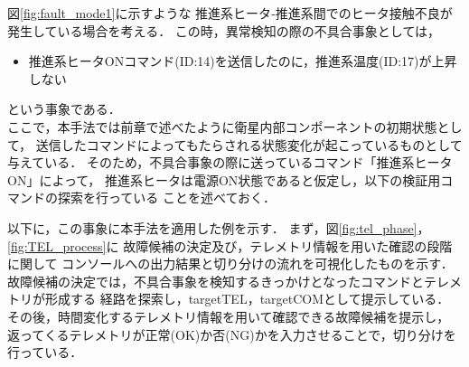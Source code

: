 \documentclass[11pt]{jsreport}
\begin{document}
図\ref{fig:fault_mode1}に示すような
推進系ヒータ‐推進系間でのヒータ接触不良が発生している場合を考える．
この時，異常検知の際の不具合事象としては，
\begin{itemize}
   \item 推進系ヒータONコマンド(ID:14)を送信したのに，推進系温度(ID:17)が上昇しない
\end{itemize}
という事象である．\\
ここで，本手法では前章で述べたように衛星内部コンポーネントの初期状態として，
送信したコマンドによってもたらされる状態変化が起こっているものとして与えている．
そのため，不具合事象の際に送っているコマンド「推進系ヒータON」によって，
推進系ヒータは電源ON状態であると仮定し，以下の検証用コマンドの探索を行っている
ことを述べておく．

以下に，この事象に本手法を適用した例を示す．
まず，図\ref{fig:tel_phase}，\ref{fig:TEL_process}に
故障候補の決定及び，テレメトリ情報を用いた確認の段階に関して
コンソールへの出力結果と切り分けの流れを可視化したものを示す．
故障候補の決定では，不具合事象を検知するきっかけとなったコマンドとテレメトリが形成する
経路を探索し，targetTEL，targetCOMとして提示している．\\
その後，時間変化するテレメトリ情報を用いて確認できる故障候補を提示し，
返ってくるテレメトリが正常(OK)か否(NG)かを入力させることで，切り分けを行っている．
\end{document}
